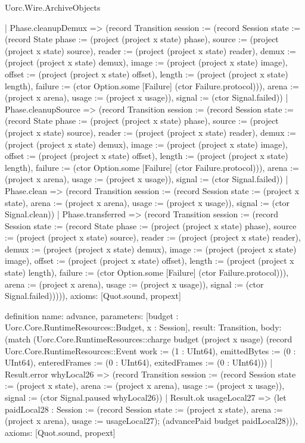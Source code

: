 \begin{lexlean}{Uorc.Wire.ArchiveObjects}
\begin{semanticmodule}
{        | Phase.cleanupDemux => (record Transition {session := (record Session {state := (record State {phase := (project (project x state) phase), source := (project (project x state) source), reader := (project (project x state) reader), demux := (project (project x state) demux), image := (project (project x state) image), offset := (project (project x state) offset), length := (project (project x state) length), failure := (ctor Option.some [Failure] (ctor Failure.protocol))}), arena := (project x arena), usage := (project x usage)}), signal := (ctor Signal.failed)})
        | Phase.cleanupSource => (record Transition {session := (record Session {state := (record State {phase := (project (project x state) phase), source := (project (project x state) source), reader := (project (project x state) reader), demux := (project (project x state) demux), image := (project (project x state) image), offset := (project (project x state) offset), length := (project (project x state) length), failure := (ctor Option.some [Failure] (ctor Failure.protocol))}), arena := (project x arena), usage := (project x usage)}), signal := (ctor Signal.failed)})
        | Phase.clean => (record Transition {session := (record Session {state := (project x state), arena := (project x arena), usage := (project x usage)}), signal := (ctor Signal.clean)})
        | Phase.transferred => (record Transition {session := (record Session {state := (record State {phase := (project (project x state) phase), source := (project (project x state) source), reader := (project (project x state) reader), demux := (project (project x state) demux), image := (project (project x state) image), offset := (project (project x state) offset), length := (project (project x state) length), failure := (ctor Option.some [Failure] (ctor Failure.protocol))}), arena := (project x arena), usage := (project x usage)}), signal := (ctor Signal.failed)})))),
  axioms: [Quot.sound, propext]
}

definition{
  name: advance,
  parameters: [budget : Uorc.Core.RuntimeResources::Budget, x : Session],
  result: Transition,
  body: (match (Uorc.Core.RuntimeResources::charge budget (project x usage) (record Uorc.Core.RuntimeResources::Event {work := (1 : UInt64), emittedBytes := (0 : UInt64), enteredFrames := (0 : UInt64), exitedFrames := (0 : UInt64)}))
    | Result.error whyLocal26 => (record Transition {session := (record Session {state := (project x state), arena := (project x arena), usage := (project x usage)}), signal := (ctor Signal.paused whyLocal26)})
    | Result.ok usageLocal27 => (let paidLocal28 : Session := (record Session {state := (project x state), arena := (project x arena), usage := usageLocal27}); (advancePaid budget paidLocal28))),
  axioms: [Quot.sound, propext]
}


\end{semanticmodule}
\end{lexlean}
